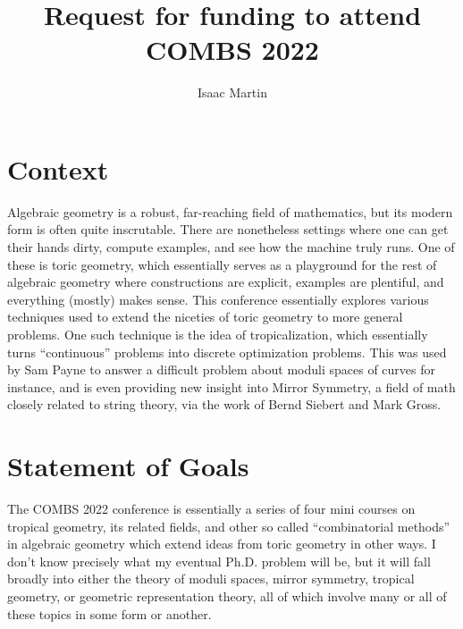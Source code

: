 \documentclass[12pt]{amsart}
\title{Request for funding to attend COMBS 2022}
\author{Isaac Martin}
\begin{document}
    \maketitle
	\section*{Context}
    Algebraic geometry is a robust, far-reaching field of mathematics, but its modern form is often quite inscrutable. There are nonetheless settings where one can get their hands dirty, compute examples, and see how the machine truly runs. One of these is toric geometry, which essentially serves as a playground for the rest of algebraic geometry where constructions are explicit, examples are plentiful, and everything (mostly) makes sense. This conference essentially explores various techniques used to extend the niceties of toric geometry to more general problems. One such technique is the idea of tropicalization, which essentially turns ``continuous'' problems into discrete optimization problems. This was used by Sam Payne to answer a difficult problem about moduli spaces of curves for instance, and is even providing new insight into Mirror Symmetry, a field of math closely related to string theory, via the work of Bernd Siebert and Mark Gross. 

	\section*{Statement of Goals}
	The COMBS 2022 conference is essentially a series of four mini courses on tropical geometry, its related fields, and other so called ``combinatorial methods'' in algebraic geometry which extend ideas from toric geometry in other ways. I don't know precisely what my eventual Ph.D. problem will be, but it will fall broadly into either the theory of moduli spaces, mirror symmetry, tropical geometry, or geometric representation theory, all of which involve many or all of these topics in some form or another. 
\end{document}
